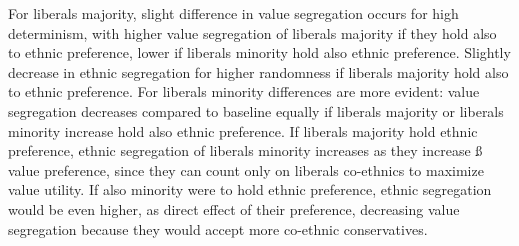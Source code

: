 \documentclass[
]{article}
\begin{document}
For liberals majority, slight difference in value segregation occurs for
high determinism, with higher value segregation of liberals majority if
they hold also to ethnic preference, lower if liberals minority hold
also ethnic preference. Slightly decrease in ethnic segregation for
higher randomness if liberals majority hold also to ethnic preference.
For liberals minority differences are more evident: value segregation
decreases compared to baseline equally if liberals majority or liberals
minority increase hold also ethnic preference. If liberals majority hold
ethnic preference, ethnic segregation of liberals minority increases as
they increase ß value preference, since they can count only on liberals
co-ethnics to maximize value utility. If also minority were to hold
ethnic preference, ethnic segregation would be even higher, as direct
effect of their preference, decreasing value segregation because they
would accept more co-ethnic conservatives.
\end{document}
